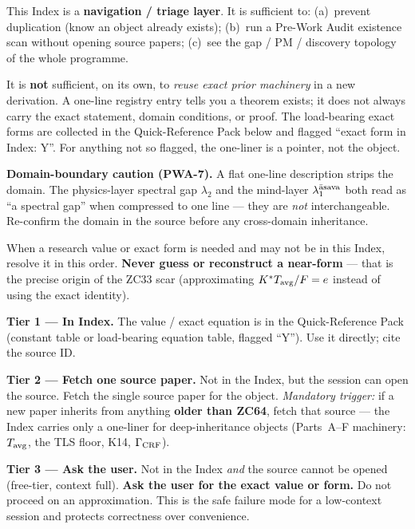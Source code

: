 \documentclass[11pt, a4paper]{article}
\newcommand{\Tavg}{T_{\rm avg}}
\begin{document}
\begin{contentsbox}[title={Scope of This Index --- Read Before Relying On It}]
This Index is a \textbf{navigation / triage layer}. It is sufficient to:
(a)~prevent duplication (know an object already exists);
(b)~run a Pre-Work Audit existence scan without opening source papers;
(c)~see the gap / PM / discovery topology of the whole programme.

\smallskip
It is \textbf{not} sufficient, on its own, to \emph{reuse exact prior
machinery} in a new derivation. A one-line registry entry tells you a
theorem exists; it does not always carry the exact statement, domain
conditions, or proof. The load-bearing exact forms are collected in the
Quick-Reference Pack below and flagged ``exact form in Index: Y''. For
anything not so flagged, the one-liner is a pointer, not the object.

\smallskip
\textbf{Domain-boundary caution (PWA-7).} A flat one-line description
strips the domain. The physics-layer spectral gap $\lambda_2$ and the
mind-layer $\lambda_1^{\rm \bar{a}sava}$ both read as ``a spectral
gap'' when compressed to one line --- they are \emph{not}
interchangeable. Re-confirm the domain in the source before any
cross-domain inheritance.
\end{contentsbox}

\begin{contentsbox}[title={Missing-Value Protocol --- Three-Tier Fallback (v17.13)}]
When a research value or exact form is needed and may not be in this
Index, resolve it in this order. \textbf{Never guess or reconstruct a
near-form} --- that is the precise origin of the ZC33 scar
(approximating $K^{*}\Tavg/F = e$ instead of using the exact identity).

\smallskip
\textbf{Tier 1 --- In Index.} The value / exact equation is in the
Quick-Reference Pack (constant table or load-bearing equation table,
flagged ``Y''). Use it directly; cite the source ID.

\smallskip
\textbf{Tier 2 --- Fetch one source paper.} Not in the Index, but the
session can open the source. Fetch the single source paper for the
object. \emph{Mandatory trigger:} if a new paper inherits from anything
\textbf{older than ZC64}, fetch that source --- the Index carries only
a one-liner for deep-inheritance objects (Parts~A--F machinery:
$\Tavg$, the TLS floor, K14, $\Gamma_{\rm CRF}$).

\smallskip
\textbf{Tier 3 --- Ask the user.} Not in the Index \emph{and} the
source cannot be opened (free-tier, context full). \textbf{Ask the user
for the exact value or form.} Do not proceed on an approximation. This
is the safe failure mode for a low-context session and protects
correctness over convenience.
\end{contentsbox}
\end{document}
